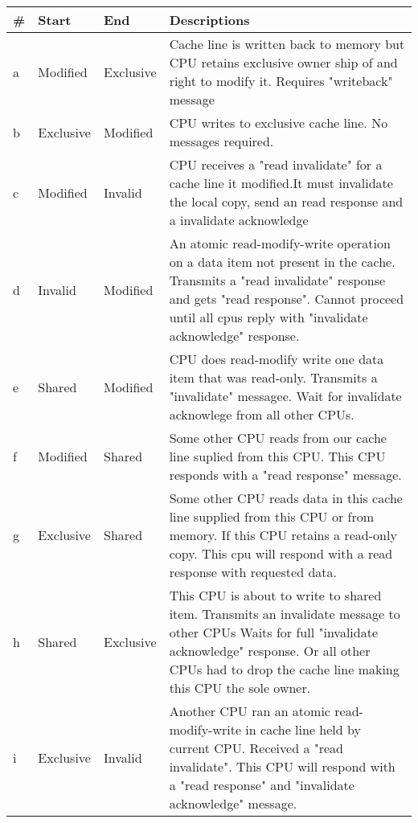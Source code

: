 \documentclass{article}
\begin{document}
\begin{tabular} {| l | l | l | p{9cm}| }    
    \hline
    \# & Start  & End   & Descriptions \\
    \hline
    a & Modified  & Exclusive &
    Cache line is written back to memory but CPU retains exclusive 
    owner ship of and right to modify it. Requires "writeback" 
    message\\
    \hline
    b& Exclusive & Modified &  
    CPU writes to exclusive cache line. No messages required. \\
    \hline
    c & Modified & Invalid &   
    CPU receives a "read invalidate" for a cache line it modified.It 
    must invalidate the local copy, send an read response and a 
    invalidate acknowledge \\
    \hline
    d & Invalid & Modified &
    An atomic read-modify-write operation on a data item not present
    in the cache. Transmits a "read invalidate" response and gets
    "read response". Cannot proceed until all cpus reply with
    "invalidate acknowledge" response.    \\

    \hline
    e & Shared & Modified & 

    CPU does read-modify write one data item that was
    read-only. Transmits a "invalidate" messagee. Wait for invalidate
    acknowlege from all other CPUs.    
    \\
    \hline
    f & Modified & Shared &

    Some other CPU reads from our cache line suplied from this
    CPU. This CPU responds with a "read response" message.    
    \\    
    \hline

    g & Exclusive & Shared & 


    Some other CPU reads data in this cache line supplied from this
    CPU or from memory. If this CPU retains a read-only copy. This cpu
    will respond with a read response with requested data.
    
    \\
    \hline
    h & Shared & Exclusive & 

    This CPU is about to write to shared item. Transmits an invalidate
    message to other CPUs Waits for full "invalidate acknowledge"
    response. Or all other CPUs had to drop the cache line making this
    CPU the sole owner. \\
    \hline
    i & Exclusive & Invalid & 

    Another CPU ran an atomic read-modify-write in cache line held by
    current CPU. Received a "read invalidate". This CPU will respond
    with a "read response" and "invalidate acknowledge" message.   \\


\end{tabular}
\end{document}
